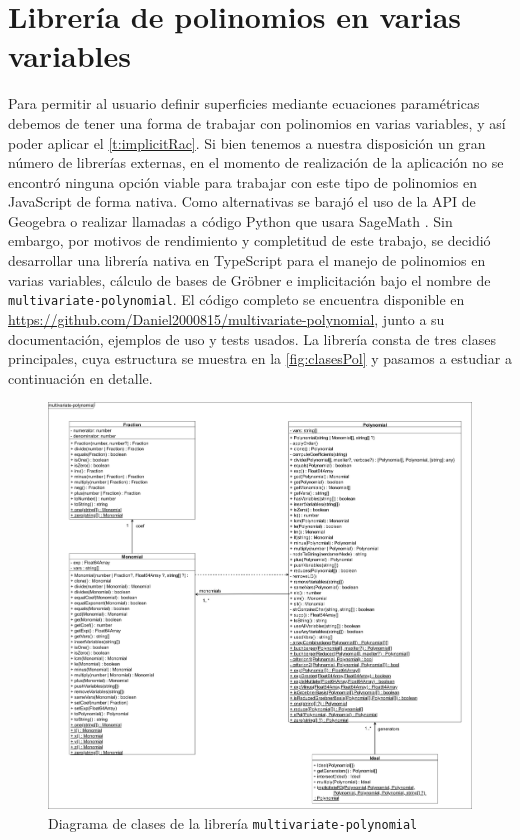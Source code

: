 \section{Librería de polinomios en varias variables}\label{sec:lib}
Para permitir al usuario definir superficies mediante ecuaciones paramétricas debemos de tener una forma de trabajar con polinomios en varias variables, y así poder aplicar el \autoref{t:implicitRac}. Si bien tenemos a nuestra disposición un gran número de librerías externas, en el momento de realización de la aplicación no se encontró ninguna opción viable para trabajar con este tipo de polinomios en JavaScript de forma nativa. Como alternativas se barajó el uso de la API de Geogebra \cite{geogebra} o realizar llamadas a código Python que usara SageMath \cite{sage}. Sin embargo, por motivos de rendimiento y completitud de este trabajo, se decidió desarrollar una librería nativa en TypeScript para el manejo de polinomios en varias variables, cálculo de bases de Gröbner e implicitación bajo el nombre de \texttt{multivariate-polynomial}. El código completo se encuentra disponible en \href{https://github.com/Daniel2000815/multivariate-polynomial}{https://github.com/Daniel2000815/multivariate-polynomial}, junto a su documentación, ejemplos de uso y tests usados. La librería consta de tres clases principales, cuya estructura se muestra en la \autoref{fig:clasesPol} y pasamos a estudiar a continuación en detalle.
\begin{figure}[ht!]
    \centering
    \includegraphics[width=\textwidth]{Plantilla-TFG-master/img/claseFinal.png}
    \caption{Diagrama de clases de la librería \texttt{multivariate-polynomial}}
    \label{fig:clasesPol}
\end{figure}


